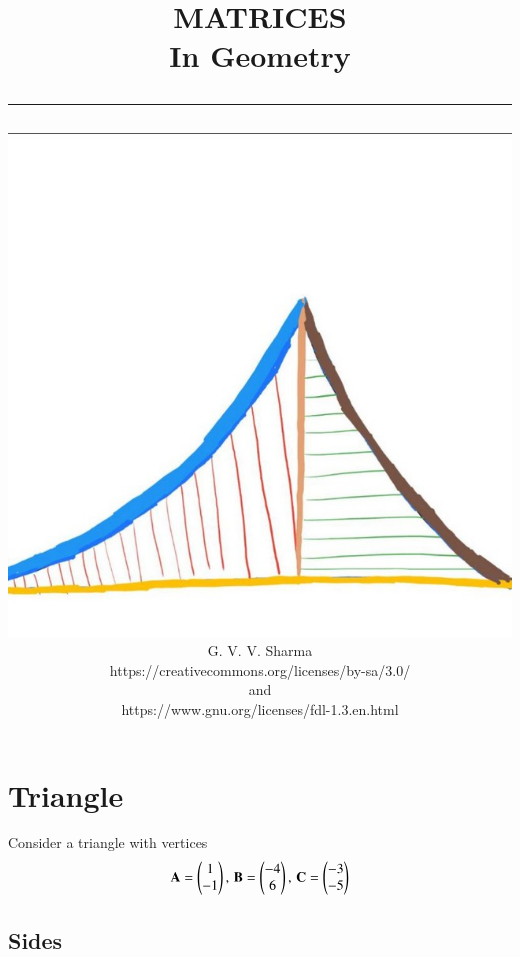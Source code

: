 \documentclass[journal]{IEEEtran}
\begin{document}

\onecolumn


\title{
	\begin{flushleft}
	MATRICES \\ In Geometry
	\\
\rule{0.4\columnwidth}{0.4pt}
\end{flushleft}
}
\author{
\vspace{7cm}
	\begin{flushleft}
\includegraphics[width=0.2\columnwidth]{figs/logo.jpg}
\\
		{	\huge G. V. V. Sharma}
		\\
\vspace{1cm}
https://creativecommons.org/licenses/by-sa/3.0/
\\
and
\\
https://www.gnu.org/licenses/fdl-1.3.en.html
	\end{flushleft}
}
\maketitle

\newpage


\tableofcontents

\newpage
\twocolumn


\renewcommand{\thefigure}{\theenumi}
\renewcommand{\thetable}{\theenumi}


\section{Triangle}
Consider a triangle with vertices
		\begin{align}
			\label{eq:tri-pts}
			\mathbf{A} = \begin{pmatrix}1 \\ -1\end{pmatrix},\,
			\mathbf{B} = \begin{pmatrix}-4 \\ 6\end{pmatrix},\,
			\mathbf{C} = \begin{pmatrix}-3 \\ -5\end{pmatrix}
		\end{align}
\subsection{Sides}

\end{document}
